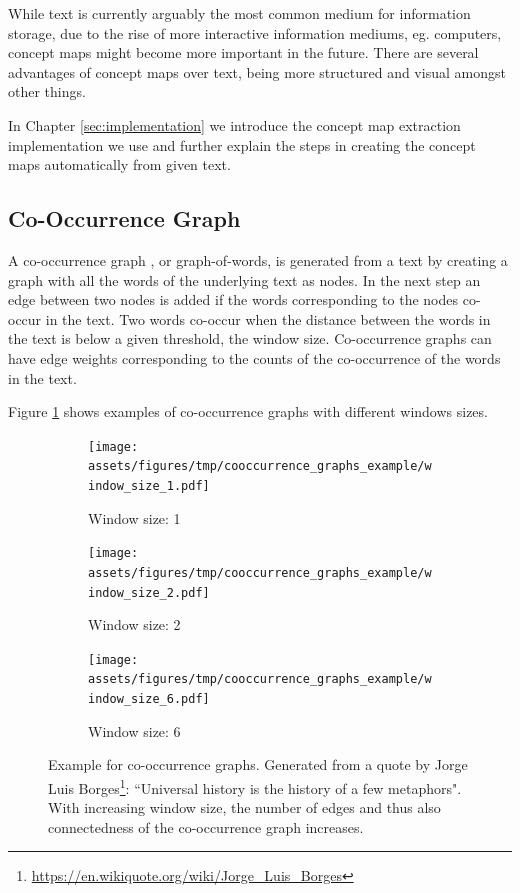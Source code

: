 While text is currently arguably the most common medium for information storage, due to the rise of more interactive information mediums, eg. computers, concept maps might become more important in the future.
There are several advantages of concept maps over text, being more structured and visual amongst other things.

In Chapter \ref{sec:implementation} we introduce the concept map extraction implementation we use and further explain the steps in creating the concept maps automatically from given text.

\subsection{Co-Occurrence Graph}
A co-occurrence graph \cite{Novak1984, Rousseau2015a, Nikolentzos2017b}, or graph-of-words, is generated from a text by creating a graph with all the words of the underlying text as nodes.
In the next step an edge between two nodes is added if the words corresponding to the nodes co-occur in the text.
Two words co-occur when the distance between the words in the text is below a given threshold, the window size.
Co-occurrence graphs can have edge weights corresponding to the counts of the co-occurrence of the words in the text.

Figure \ref{fig:cooccurrence_graphs} shows examples of co-occurrence graphs with different windows sizes.

\begin{figure}[htb!]%
    \centering
    \begin{subfigure}[t]{0.32\linewidth}{\texttt{[image: assets/figures/tmp/cooccurrence\_graphs\_example/window\_size\_1.pdf]}}%
    \caption{Window size: 1}%
    \end{subfigure}
    \begin{subfigure}[t]{0.32\linewidth}{\texttt{[image: assets/figures/tmp/cooccurrence\_graphs\_example/window\_size\_2.pdf]}}%
    \caption{Window size: 2}%
    \end{subfigure}
	\begin{subfigure}[t]{0.32\linewidth}{\texttt{[image: assets/figures/tmp/cooccurrence\_graphs\_example/window\_size\_6.pdf]}}%
    \caption{Window size: 6}%
    \end{subfigure}
    \caption[Example: Co-Occurrence Graph]{Example for co-occurrence graphs. Generated from a quote by Jorge Luis Borges\footnote{\url{https://en.wikiquote.org/wiki/Jorge\_Luis\_Borges}}: ``Universal history is the history of a few metaphors".
    	With increasing window size, the number of edges and thus also connectedness of the co-occurrence graph increases.}%
    \label{fig:cooccurrence_graphs}%
\end{figure}

